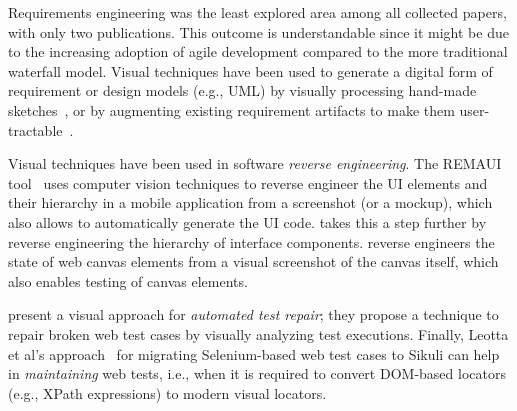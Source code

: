 Requirements engineering was the least explored area among all collected papers, with only two publications. This outcome is understandable since it might be due to the increasing adoption of agile development compared to the more traditional waterfall model. 
Visual techniques have been used to generate a digital form of requirement or design models (e.g., UML)
by visually processing hand-made sketches~\cite{Scharf-2013-ICSE},
or by augmenting existing requirement artifacts to make them user-tractable~\cite{Li-2010-CHI}.



Visual techniques have been used in software \textit{reverse engineering}.
The REMAUI tool~\cite{Nguyen-2015-ASE} uses computer vision techniques to reverse engineer the UI elements and their hierarchy in a mobile application
from a screenshot (or a mockup), which also allows to automatically generate the UI code.
\citet{Dixon-2011-CHI} takes this a step further by reverse engineering the hierarchy of interface components. 
\citet{canvas_icst2018} reverse engineers the state of web canvas elements from a visual screenshot of the canvas itself, which also enables testing of canvas elements. 



\citet{Stocco-2018-FSE} present a visual approach for \emph{automated test repair}; they propose a technique to repair broken web test cases by visually analyzing test executions.
Finally, Leotta et al's approach~\cite{Leotta-2018-STVR} for migrating Selenium-based web test cases to Sikuli
can help in \textit{maintaining} web tests, i.e., when it is required to convert DOM-based locators (e.g., XPath expressions)
to modern visual locators.



